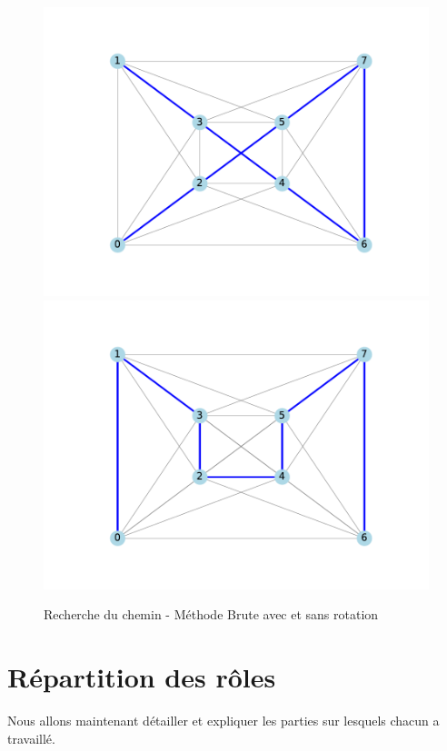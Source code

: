 \documentclass{article}
\begin{document}
\begin{figure}
	\centering
	\includegraphics[scale=0.4]{figs/best_path_data1_slow_turning.pdf}
	\includegraphics[scale=0.4]{figs/best_path_data1.pdf}
	\caption{Recherche du chemin - Méthode Brute avec et sans rotation}
	\label{tsp_turn_2}
\end{figure}

\section{Répartition des rôles}

Nous allons maintenant détailler et expliquer les parties sur lesquels chacun a travaillé.
\end{document}
